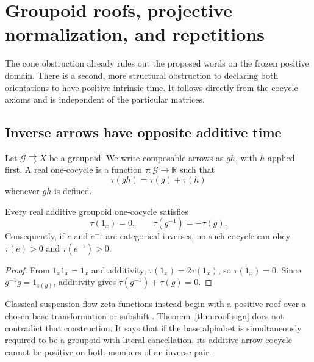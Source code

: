 \section{Groupoid roofs, projective normalization, and repetitions}
\label{sec:roof}

The cone obstruction already rules out the proposed words on the frozen
positive domain.  There is a second, more structural obstruction to declaring
both orientations to have positive intrinsic time.  It follows directly from
the cocycle axioms and is independent of the particular matrices.

\subsection{Inverse arrows have opposite additive time}

Let $\mathcal G\rightrightarrows X$ be a groupoid.  We write composable arrows
as $gh$, with $h$ applied first.  A real one-cocycle is a function
$\tau:\mathcal G\to\mathbb R$ such that
\begin{equation}
  \tau(gh)=\tau(g)+\tau(h)
  \label{eq:additive-cocycle}
\end{equation}
whenever $gh$ is defined.

\begin{theorem}
\label{thm:roof-sign}
Every real additive groupoid one-cocycle satisfies
\begin{equation}
  \tau(1_x)=0,\qquad \tau(g^{-1})=-\tau(g).
  \label{eq:inverse-sign}
\end{equation}
Consequently, if $e$ and $e^{-1}$ are categorical inverses, no such cocycle
can obey $\tau(e)>0$ and $\tau(e^{-1})>0$.
\end{theorem}

\begin{proof}
From $1_x1_x=1_x$ and additivity,
$\tau(1_x)=2\tau(1_x)$, so $\tau(1_x)=0$.  Since
$g^{-1}g=1_{s(g)}$, additivity gives
$\tau(g^{-1})+\tau(g)=0$.
\end{proof}

Classical suspension-flow zeta functions instead begin with a positive roof
over a chosen base transformation or subshift
\citep[Chapter~6]{ParryPollicott1990}.  Theorem~\ref{thm:roof-sign} does not
contradict that construction.  It says that if the base alphabet is
simultaneously required to be a groupoid with literal cancellation, its
additive arrow cocycle cannot be positive on both members of an inverse pair.

